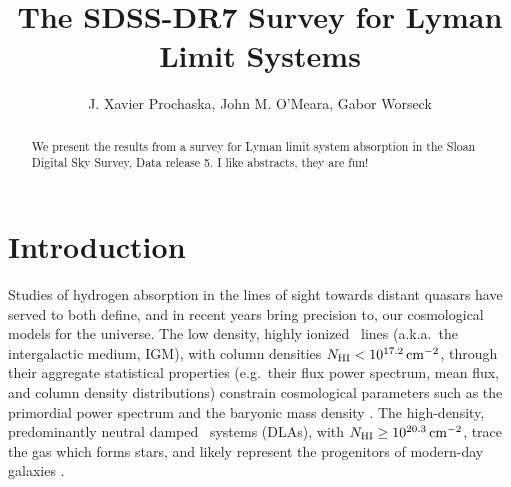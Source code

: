 \documentclass[12pt,preprint]{aastex}
\begin{document}
\def \slls {$\sigma_{\rm LLS}$}
\def \mnlls {n_{\rm LLS}}
\def \mslls {\sigma_{\rm LLS}}
\def \drlls {$\Delta r_{\rm LLS}$}
\def \mdrlls {\Delta r_{\rm LLS}}
\def \mlmfp {\lambda_{\rm mfp}^{912}}
\def \lmfp {$\lambda_{\rm mfp}^{912}$}
\def \mbplls {\beta_{\rm pLLS}}
\def \bplls {$\beta_{\rm pLLS}$}
\def \btlls {$\beta_{\rm LLS}$}
\def \mbtlls {\beta_{\rm LLS}}
\def \lteff {$\tau_{\rm eff,LL}$}
\def \teff {$\tau_{\rm eff,LL}$}
\def \tlya {$\tau_{\rm eff}^{\rm Ly\alpha}$}
\def \mtlya {\tau_{\rm eff}^{\rm Ly\alpha}}
\def \mteff {\tau_{\rm eff}}
\def \mllteff {\mteff^{912}}
\def \llteff {$\mteff^{912}$}
\def \mnmin {\mnhi^{\rm min}}
\def \nmin {$\mnhi^{\rm min}$}
\def \O {${\mathcal O}(N,X)$}
\newcommand{\cm}[1]{\, {\rm cm^{#1}}}
\def \snrlim {SNR$_{lim}$}
\def\mglls {\gamma_{\rm LLS}}
\def\mavgt {<\mtll>}

\title{The SDSS-DR7 Survey for Lyman Limit Systems}

\author{
J. Xavier Prochaska, 
John M. O'Meara, 
Gabor Worseck 
}

\begin{abstract}
We present the results from a survey for Lyman limit system absorption in the Sloan Digital Sky Survey, Data release 5.  I like abstracts, they are fun!
\end{abstract}



\section{Introduction}
Studies of hydrogen  absorption in the lines of sight towards 
distant quasars have served to both define, and in recent years bring
precision to, our cosmological models for the universe.  
The low density, highly ionized  \lyaf\ lines (a.k.a.\ the intergalactic
medium, IGM), with 
 column densities $\mnhi < 10^{17.2} \cm{-2}$,
through their aggregate statistical properties (e.g.\ their
flux power spectrum, mean flux, and column density distributions)
constrain cosmological parameters such as the primordial power spectrum
and the baryonic mass density
\citep[e.g.][]{rau98,cwb+03,mcdonald05,tytler04,fpl+08}.
The high-density, predominantly neutral damped \lya\ systems (DLAs),
with $\mnhi \ge 10^{20.3} \cm{-2}$, trace the gas which forms stars, and
likely represent the progenitors of modern-day galaxies 
\citep[e.g.][]{wlf+95,wgp05,pw09}.
\end{document}

